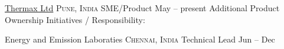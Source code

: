 \documentclass[10pt,a4paper]{article}
\begin{document}
\vspace{-1.25em}
\begin{multicols}{3}
	\begin{flushleft}
		
	\end{flushleft}
\end{multicols}
\spacedhrule{-0.1em}{-0.4em}



\headedsection  %
{\href{https://www.thermaxglobal.com/}{Thermax Ltd}}
{\textsc{Pune, India}} {%
	\headedsubsection
	{SME/Product}
	{May  -- present}
	{
		\bodytext{
			
		}
	}
	\headedsubsection
	{Additional Product Ownership Initiatives / Responsibility:}
	{}
	{
	}
}

\headedsection  %
{Energy and Emission Laboraties}
{\textsc{Chennai, India}} {%
	\headedsubsection
	{Technical Lead}
	{Jun  -- Dec }
	{\bodytext{}}
}

\vspace{1em}
\spacedhrule{-0.2em}{-0.4em}

\end{document}
